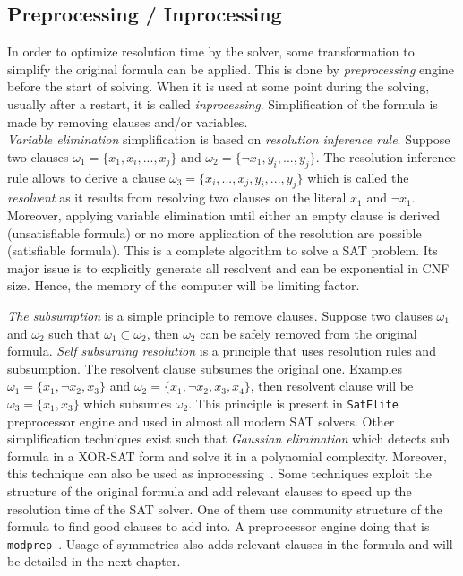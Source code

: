 \subsection{Preprocessing / Inprocessing}
In order to optimize resolution time by the solver, some transformation to simplify the original formula can be applied.
This is done by \emph{preprocessing} engine before the start of solving.
When it is used at some point during the solving, usually after a restart, it is called \emph{inprocessing}.
Simplification of the formula is made by removing clauses and/or variables.\\

\emph{Variable elimination} simplification is based on \emph{resolution inference rule}.
Suppose two clauses $\omega_1 = \{x_1, x_i, ..., x_j \}$ and $\omega_2 = \{\neg x_1, y_i, ..., y_j\}$.
The resolution inference rule allows to derive a clause $\omega_3 = \{x_i, ..., x_j, y_i, ..., y_j\}$ which is called
the \emph{resolvent} as it results from resolving two clauses on the literal $x_1$ and $\neg x_1$.
Moreover,  applying variable elimination until either an empty clause is derived (unsatisfiable formula) or 
no more application of the resolution are possible (satisfiable formula). This is a complete algorithm to solve a SAT problem.
Its major issue is to explicitly generate all resolvent and can be exponential in CNF size.
Hence, the memory of the computer will be limiting factor.

\emph{The subsumption} is a simple principle to remove clauses. Suppose two clauses $\omega_1$ and $\omega_2$ such that
$\omega_1 \subset  \omega_2$, then $\omega_2$ can be safely removed from the original formula.
\emph{Self subsuming resolution} is a principle that uses resolution rules and subsumption.
The resolvent clause subsumes the original one. Examples $\omega_1 = \{x_1, \neg x_2, x_3\}$ and $\omega_2 = \{x_1, \neg x_2, x_3, x_4\}$,
 then resolvent clause will be $\omega_3 = \{x_1, x_3\}$ which subsumes $\omega_2$. This principle
is present in \texttt{SatElite}~\cite{een2005effective} preprocessor engine and used in almost all modern SAT solvers.
Other simplification techniques exist such that \emph{Gaussian elimination} which detects sub formula in a XOR-SAT
form and solve it in a polynomial complexity. Moreover, this technique can also be used as inprocessing~\cite{soos2010enhanced}. 
Some techniques exploit the structure of the original formula and add relevant clauses to speed up the resolution
time of the SAT solver. One of them use community structure of the formula to find good clauses to add into.
A preprocessor engine doing that is  \texttt{modprep}~\cite{ansotegui2015using}.
Usage of symmetries also adds relevant clauses in the formula and will be detailed in the next chapter.

